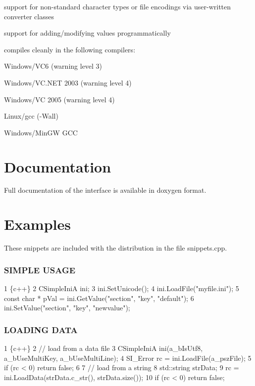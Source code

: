 \begin{DoxyItemize}
\item support for non-\/standard character types or file encodings via user-\/written converter classes
\item support for adding/modifying values programmatically
\item compiles cleanly in the following compilers\+:
\begin{DoxyItemize}
\item Windows/\+V\+C6 (warning level 3)
\item Windows/\+V\+C.\+N\+ET 2003 (warning level 4)
\item Windows/\+VC 2005 (warning level 4)
\item Linux/gcc (-\/\+Wall)
\item Windows/\+Min\+GW G\+CC
\end{DoxyItemize}
\end{DoxyItemize}

\section*{Documentation}

Full documentation of the interface is available in doxygen format.

\section*{Examples}

These snippets are included with the distribution in the file snippets.\+cpp.

\subsubsection*{S\+I\+M\+P\+LE U\+S\+A\+GE}


\begin{DoxyCode}
1 \{c++\}
2 CSimpleIniA ini;
3 ini.SetUnicode();
4 ini.LoadFile("myfile.ini");
5 const char * pVal = ini.GetValue("section", "key", "default");
6 ini.SetValue("section", "key", "newvalue");
\end{DoxyCode}


\subsubsection*{L\+O\+A\+D\+I\+NG D\+A\+TA}


\begin{DoxyCode}
1 \{c++\}
2 // load from a data file
3 CSimpleIniA ini(a\_bIsUtf8, a\_bUseMultiKey, a\_bUseMultiLine);
4 SI\_Error rc = ini.LoadFile(a\_pszFile);
5 if (rc < 0) return false;
6 
7 // load from a string
8 std::string strData;
9 rc = ini.LoadData(strData.c\_str(), strData.size());
10 if (rc < 0) return false;
\end{DoxyCode}


